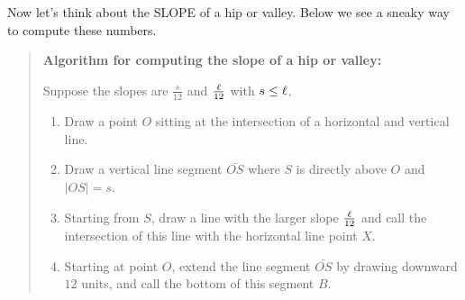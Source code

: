 \documentclass[hints,nooutcomes,noauthor]{ximera}
\begin{document}
\begin{question}
  Now let's think about the SLOPE of a hip or valley. Below we see a
  sneaky way to compute these numbers.
  \begin{mdframed}[style=OutcomeStyle]
\begin{quote}
  \textbf{Algorithm for computing the slope of a hip or valley:}

  Suppose the slopes are $\frac{s}{12}$ and $\frac{\ell}{12}$ with
$s\le \ell$.

\begin{enumerate}
\item Draw a point $O$ sitting at the intersection of a horizontal
  and vertical line.
\item Draw a vertical line segment $\bar{OS}$ where $S$ is directly
  above $O$ and $|OS| = s$.
  \item Starting from $S$, draw a line with the larger slope
    $\frac{\ell}{12}$ and call the intersection of this line with the
    horizontal line point $X$.
  \item Starting at point $O$, extend the line segment $\bar{OS}$ by
    drawing downward $12$ units, and call the bottom of this segment
    $B$.
     \begin{center}
\end{center}
\end{enumerate}
\end{quote}
\end{mdframed}
\end{question}
\end{document}
